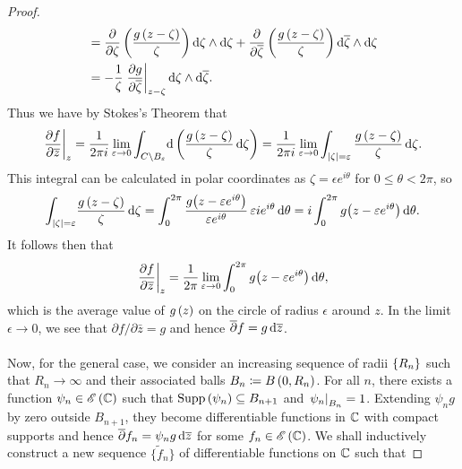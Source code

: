 \documentclass[../Moduli_Spaces_of_Riemann_Surfaces.tex]{subfiles}
\begin{document}
\begin{proof}
\begin{equation*}
\begin{aligned}
                   &=\frac{\partial}{\partial\zeta}\left(\frac{g\left(z-\zeta\right)}{\zeta}\right)\mathrm{d}\zeta\wedge\mathrm{d}\zeta+\frac{\partial}{\partial\overline{\zeta}}\left(\frac{g\left(z-\zeta\right)}{\zeta}\right)\mathrm{d}\overline{\zeta}\wedge\mathrm{d}\zeta \\
                   &=-\frac{1}{\zeta}\left.\frac{\partial g}{\partial\overline{\zeta}}\right|_{z-\zeta}\mathrm{d}\zeta\wedge\mathrm{d}\overline{\zeta}.
            \end{aligned}
        \end{equation*}
        Thus we have by Stokes's Theorem that
        \begin{equation*}
            \left.\frac{\partial f}{\partial\overline{z}}\right|_z=\frac{1}{2\pi i}\lim\limits_{\varepsilon\to0}\int_{C\setminus B_\varepsilon}\!\mathrm{d}\left(\frac{g\left(z-\zeta\right)}{\zeta}\,\mathrm{d}\zeta\right)=\frac{1}{2\pi i}\lim\limits_{\varepsilon\to0}\int_{\left|\zeta\right|=\varepsilon}\frac{g\left(z-\zeta\right)}{\zeta}\,\mathrm{d}\zeta.
        \end{equation*}
        This integral can be calculated in polar coordinates as $\zeta=\epsilon e^{i\theta}$ for $0\leq\theta<2\pi$, so
        \begin{equation*}
            \int_{\left|\zeta\right|=\varepsilon}\!\frac{g\left(z-\zeta\right)}{\zeta}\,\mathrm{d}\zeta=\int_{0}^{2\pi}\frac{g\big(z-\varepsilon e^{i\theta}\big)}{\varepsilon e^{i\theta}}\,\varepsilon ie^{i\theta}\,\mathrm{d}\theta=i\int_{0}^{2\pi}g\big(z-\varepsilon e^{i\theta}\big)\,\mathrm{d}\theta.
        \end{equation*}
        It follows then that
        \begin{equation*}
            \left.\frac{\partial f}{\partial\overline{z}}\right|_z=\frac{1}{2\pi}\lim\limits_{\varepsilon\to0}\int_{0}^{2\pi}g\big(z-\varepsilon e^{i\theta}\big)\,\mathrm{d}\theta,
        \end{equation*}
        which is the average value of $g\left(z\right)$ on the circle of radius $\epsilon$ around $z$. In the limit $\epsilon\to0$, we see that $\partial f/\partial\bar{z}=g$ and hence $\overline{\partial}f=g\,\mathrm{d}\overline{z}$.\\\ \\
        Now, for the general case, we consider an increasing sequence of radii $\left\{R_n\right\}$ such that $R_n\to\infty$ and their associated balls $B_n\coloneqq B\left(0,R_n\right)$. For all $n$, there exists a function $\psi_n\in\mathscr{E}\left(\mathbb{C}\right)$ such that $\operatorname{Supp}\left(\psi_n\right)\subseteq B_{n+1}$ and $\left.\psi_n\right|_{B_n}=1$. Extending $\psi_ng$ by zero outside $B_{n+1}$, they become differentiable functions in $\mathbb{C}$ with compact supports and hence $\overline{\partial}f_n=\psi_ng\,\mathrm{d}\overline{z}$ for some $f_n\in\mathscr{E}\left(\mathbb{C}\right)$. We shall inductively construct a new sequence $\big\{\tilde{f}_n\big\}$ of differentiable functions on $\mathbb{C}$ such that

\end{proof}
\end{document}
